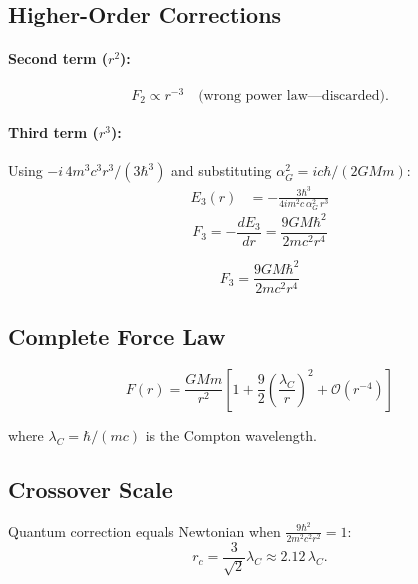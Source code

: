 \documentclass[11pt,a4paper]{article}
\theoremstyle{definition}
\theoremstyle{remark}
\begin{document}
	\subsection{Higher-Order Corrections}
	
	\paragraph{Second term ($r^2$):}
	\begin{equation}
		F_2 \propto r^{-3} \quad\text{(wrong power law---discarded)}.
	\end{equation}
	
	\paragraph{Third term ($r^3$):}
	Using $-i\,4m^3c^3r^3/(3\hbar^3)$ and substituting $\alpha_G^2=ic\hbar/(2GMm)$:
	\begin{align}
		E_3(r) &= -\frac{3\hbar^3}{4im^2c\,\alpha_G^2\,r^3}
	\end{align}
	\begin{equation}
		F_3 = -\frac{dE_3}{dr} = \frac{9GM\hbar^2}{2mc^2r^4}
	\end{equation}
	
	\begin{equation}
		\boxed{F_3 = \frac{9GM\hbar^2}{2mc^2r^4}}
	\end{equation}
	
	\subsection{Complete Force Law}
	
	\begin{equation}
		\boxed{F(r) = \frac{GMm}{r^2}\left[1 + \frac{9}{2}\left(\frac{\lambda_C}{r}\right)^2 + \mathcal{O}(r^{-4})\right]}
	\end{equation}
	
	where $\lambda_C=\hbar/(mc)$ is the Compton wavelength.
	
	\subsection{Crossover Scale}
	
	Quantum correction equals Newtonian when $\frac{9\hbar^2}{2m^2c^2r^2}=1$:
	\begin{equation}
		r_c = \frac{3}{\sqrt{2}}\lambda_C \approx 2.12\,\lambda_C.
	\end{equation}
	
\end{document}
